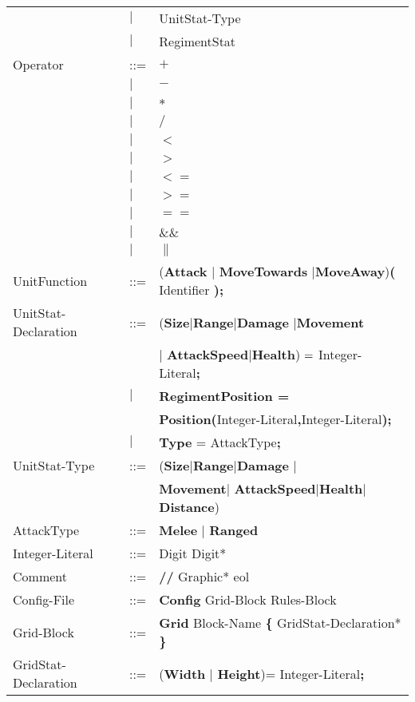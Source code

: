 \begin{center}
\begin{longtable}{ l l l }
								&$\mid$	&UnitStat-Type\\
								&$\mid$	&RegimentStat \\	
	Operator					&	::=	&$\boldsymbol {+}$\\
								&$\mid$	&$\boldsymbol {-}$\\
								&$\mid$	&$\boldsymbol {*}$\\
								&$\mid$	&$\boldsymbol {/}$\\
								&$\mid$	&$\boldsymbol {<}$\\
								&$\mid$	&$\boldsymbol {>}$\\
								&$\mid$	&$\boldsymbol {<=}$\\
								&$\mid$	&$\boldsymbol {>=}$\\
								&$\mid$	&$\boldsymbol {==}$\\
								&$\mid$	&$\boldsymbol {\&\&}$\\
								&$\mid$	&$\boldsymbol {\|}$\\
	UnitFunction				&	::=	&({\bf Attack} $\mid$ {\bf MoveTowards} $\mid${\bf MoveAway}){\bf (} Identifier {\bf );}\\
	UnitStat-Declaration		&	::=	&({\bf Size}$\mid${\bf Range}$\mid${\bf Damage} $\mid${\bf Movement}\\ 
								&		&$\mid$ {\bf AttackSpeed}$\mid${\bf Health}) ${\bf = }$ Integer-Literal{\bf ;} \\
								&$\mid$	&{\bf RegimentPosition =} \\
								&		&{\bf Position(}Integer-Literal{\bf ,}Integer-Literal{\bf );}\\
								&$\mid$	&{\bf Type} = AttackType{\bf ;}\\
	UnitStat-Type				&	::=	&({\bf Size}$\mid${\bf Range}$\mid${\bf Damage} $\mid$\\
								&		&{\bf Movement}$\mid$ {\bf AttackSpeed}$\mid${\bf Health}$\mid${\bf Distance})\\ 
	AttackType					&	::=	&{\bf Melee} $\mid$ {\bf Ranged} \\
	Integer-Literal				&	::=	&Digit Digit*\\
	Comment						&	::=	&{\bf //} Graphic* eol\\
	Config-File					&	::=	&{\bf Config} Grid-Block Rules-Block  		\\
	Grid-Block					&	::=	&{\bf Grid} Block-Name	 {\bf \{} GridStat-Declaration* \bf{\}} \\
	GridStat-Declaration		&	::=	&({\bf Width} $\mid$ {\bf Height})=  Integer-Literal{\bf ;} \\	

\end{longtable}
\end{center}
